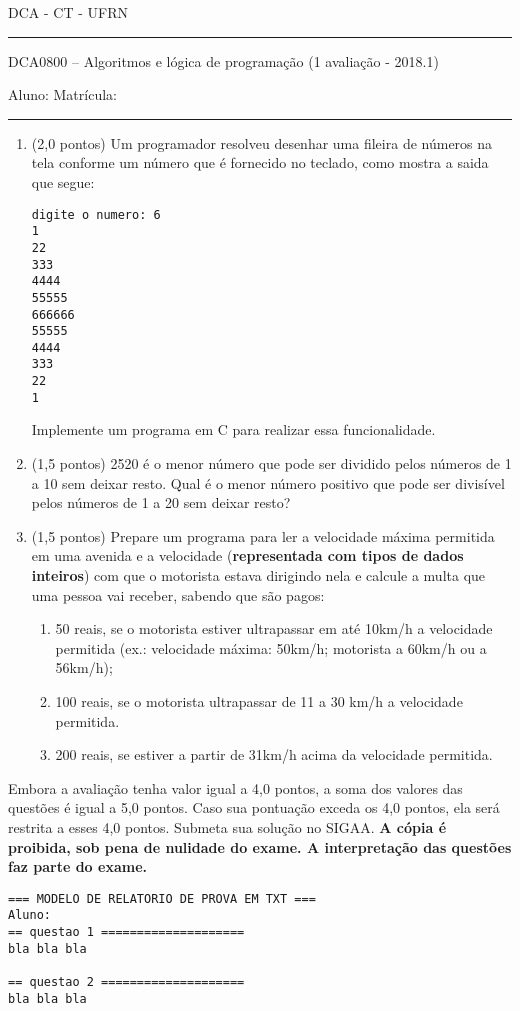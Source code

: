 \documentclass[12pt,a4paper]{article}
\begin{document}
\begin{center}\scshape
  DCA - CT - UFRN
\rule{\linewidth}{1pt}
\end{center}
 
\begin{center}\Large
DCA0800 -- Algoritmos e lógica de programação (1\raisebox{0.5ex}{\small a} avaliação - 2018.1)\\
\end{center}
\noindent Aluno:\hrulefill \vspace{2mm} Matrícula: \rule{2.5cm}{0.4pt}

\begin{enumerate}

\item (2,0 pontos) Um programador resolveu desenhar uma fileira de
  números na tela conforme um número que é fornecido no teclado, como
  mostra a saida que segue:
\begin{verbatim}
digite o numero: 6
1
22
333
4444
55555
666666
55555
4444
333
22
1
\end{verbatim}

Implemente um programa em C para realizar essa funcionalidade.

\item (1,5 pontos) 2520 é o menor número que pode ser dividido pelos números de 1 a
  10 sem deixar resto. Qual é o menor número positivo que pode ser
  divisível pelos números de 1 a 20 sem deixar resto?

\item (1,5 pontos) Prepare um programa para ler a velocidade máxima permitida em
  uma avenida e a velocidade ({\bf representada com tipos de dados
  inteiros}) com que o motorista estava dirigindo nela e calcule a
  multa que uma pessoa vai receber, sabendo que são pagos:

  \begin{enumerate}
  \item 50 reais, se o motorista estiver ultrapassar em até 10km/h a
    velocidade permitida (ex.: velocidade máxima: 50km/h; motorista a
    60km/h ou a 56km/h);
  \item 100 reais, se o motorista ultrapassar de 11 a 30 km/h a velocidade permitida.
  \item 200 reais, se estiver a partir de 31km/h acima da velocidade permitida.
  \end{enumerate}


\end{enumerate}

Embora a avaliação tenha valor igual a 4,0 pontos, a soma dos valores
das questões é igual a 5,0 pontos. Caso sua pontuação exceda os 4,0
pontos, ela será restrita a esses 4,0 pontos.  Submeta sua solução no
SIGAA. {\bf A cópia é proibida, sob pena de nulidade do exame. A
  interpretação das questões faz parte do exame.}
\begin{verbatim}
=== MODELO DE RELATORIO DE PROVA EM TXT ===
Aluno:
== questao 1 ====================
bla bla bla

== questao 2 ====================
bla bla bla
\end{verbatim}
\end{document}
